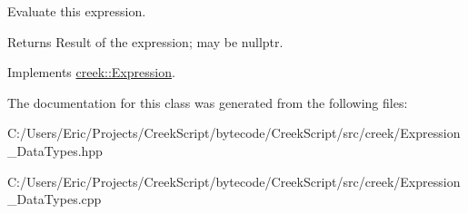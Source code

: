 Evaluate this expression. 

\begin{DoxyReturn}{Returns}
Result of the expression; may be {\ttfamily nullptr}. 
\end{DoxyReturn}


Implements \hyperlink{classcreek_1_1_expression_a3c7fe4a04e24c8d907f918240e2bf43d}{creek\+::\+Expression}.



The documentation for this class was generated from the following files\+:\begin{DoxyCompactItemize}
\item 
C\+:/\+Users/\+Eric/\+Projects/\+Creek\+Script/bytecode/\+Creek\+Script/src/creek/Expression\+\_\+\+Data\+Types.\+hpp\item 
C\+:/\+Users/\+Eric/\+Projects/\+Creek\+Script/bytecode/\+Creek\+Script/src/creek/Expression\+\_\+\+Data\+Types.\+cpp\end{DoxyCompactItemize}

